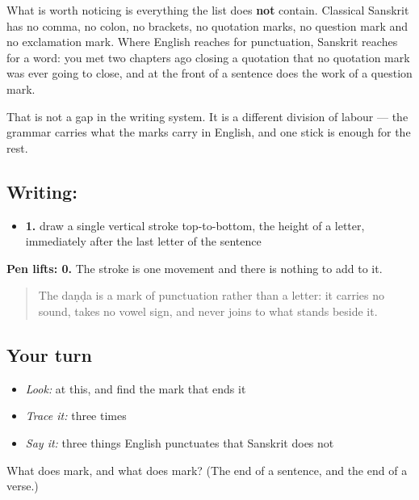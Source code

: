 What is worth noticing is everything the list does \textbf{not} contain. Classical Sanskrit has no comma, no colon, no brackets, no quotation marks, no question mark and no exclamation mark. Where English reaches for punctuation, Sanskrit reaches for a word: you met \textbf{} two chapters ago closing a quotation that no quotation mark was ever going to close, and \textbf{} at the front of a sentence does the work of a question mark.

That is not a gap in the writing system. It is a different division of labour — the grammar carries what the marks carry in English, and one stick is enough for the rest.

\subsection*{Writing: }
\begin{itemize}
\raggedright
  \item \textbf{1.} draw a single vertical stroke top-to-bottom, the height of a letter, immediately after the last letter of the sentence
\end{itemize}

\textbf{Pen lifts: 0.} The stroke is one movement and there is nothing to add to it.

\begin{quote}
The daṇḍa is a mark of punctuation rather than a letter: it carries no sound, takes no vowel sign, and never joins to what stands beside it.
\end{quote}

\subsection*{Your turn}
\begin{itemize}
\raggedright
  \item \emph{Look:} at this, and find the mark that ends it
\end{itemize}

\begin{quote}
   
\end{quote}

\begin{itemize}
\raggedright
  \item \emph{Trace it:} \textbf{} three times
  \item \emph{Say it:} three things English punctuates that Sanskrit does not
\end{itemize}

\begin{tcolorbox}[breakable,colback=teal!4,colframe=teal!35!black,title={Before you move on}]
What does \textbf{} mark, and what does \textbf{} mark? (The end of a sentence, and the end of a verse.)
\end{tcolorbox}
